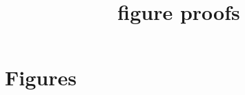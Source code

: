 \documentclass[conference]{IEEEtran}
\begin{document}
\title{\upycore{} figure proofs}
\author{}
\maketitle

\section{Figures}









\end{document}
